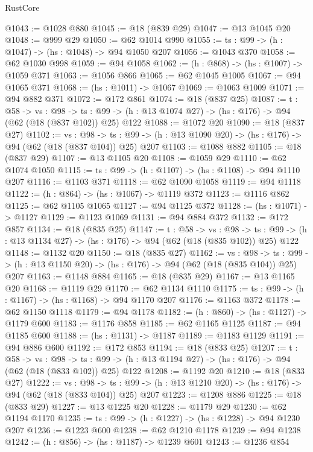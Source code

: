 \begin{lexlean}{RustCore}
\begin{coremodule}
@1043 := @1028 @880
@1045 := @18 (@839 @29)
@1047 := @13 @1045 @20
@1048 := @999 @29
@1050 := @62 @1014 @990
@1055 := {ts : @99} -> (h : @1047) -> (hs : @1048) -> @94 @1050 @207
@1056 := @1043 @370
@1058 := @62 @1030 @998
@1059 := @94 @1058
@1062 := (h : @868) -> (hs : @1007) -> @1059 @371
@1063 := @1056 @866
@1065 := @62 @1045 @1005
@1067 := @94 @1065 @371
@1068 := (hs : @1011) -> @1067
@1069 := @1063 @1009
@1071 := @94 @882 @371
@1072 := @172 @861
@1074 := @18 (@837 @25)
@1087 := {t : @58} ->
  {vs : @98} ->
  {ts : @99} -> (h : @13 @1074 @27) -> (hs : @176) -> @94 (@62 (@18 (@837 @102)) @25) @122
@1088 := @1072 @20
@1090 := @18 (@837 @27)
@1102 := {vs : @98} ->
  {ts : @99} -> (h : @13 @1090 @20) -> (hs : @176) -> @94 (@62 (@18 (@837 @104)) @25) @207
@1103 := @1088 @882
@1105 := @18 (@837 @29)
@1107 := @13 @1105 @20
@1108 := @1059 @29
@1110 := @62 @1074 @1050
@1115 := {ts : @99} -> (h : @1107) -> (hs : @1108) -> @94 @1110 @207
@1116 := @1103 @371
@1118 := @62 @1090 @1058
@1119 := @94 @1118
@1122 := (h : @864) -> (hs : @1067) -> @1119 @372
@1123 := @1116 @862
@1125 := @62 @1105 @1065
@1127 := @94 @1125 @372
@1128 := (hs : @1071) -> @1127
@1129 := @1123 @1069
@1131 := @94 @884 @372
@1132 := @172 @857
@1134 := @18 (@835 @25)
@1147 := {t : @58} ->
  {vs : @98} ->
  {ts : @99} -> (h : @13 @1134 @27) -> (hs : @176) -> @94 (@62 (@18 (@835 @102)) @25) @122
@1148 := @1132 @20
@1150 := @18 (@835 @27)
@1162 := {vs : @98} ->
  {ts : @99} -> (h : @13 @1150 @20) -> (hs : @176) -> @94 (@62 (@18 (@835 @104)) @25) @207
@1163 := @1148 @884
@1165 := @18 (@835 @29)
@1167 := @13 @1165 @20
@1168 := @1119 @29
@1170 := @62 @1134 @1110
@1175 := {ts : @99} -> (h : @1167) -> (hs : @1168) -> @94 @1170 @207
@1176 := @1163 @372
@1178 := @62 @1150 @1118
@1179 := @94 @1178
@1182 := (h : @860) -> (hs : @1127) -> @1179 @600
@1183 := @1176 @858
@1185 := @62 @1165 @1125
@1187 := @94 @1185 @600
@1188 := (hs : @1131) -> @1187
@1189 := @1183 @1129
@1191 := @94 @886 @600
@1192 := @172 @853
@1194 := @18 (@833 @25)
@1207 := {t : @58} ->
  {vs : @98} ->
  {ts : @99} -> (h : @13 @1194 @27) -> (hs : @176) -> @94 (@62 (@18 (@833 @102)) @25) @122
@1208 := @1192 @20
@1210 := @18 (@833 @27)
@1222 := {vs : @98} ->
  {ts : @99} -> (h : @13 @1210 @20) -> (hs : @176) -> @94 (@62 (@18 (@833 @104)) @25) @207
@1223 := @1208 @886
@1225 := @18 (@833 @29)
@1227 := @13 @1225 @20
@1228 := @1179 @29
@1230 := @62 @1194 @1170
@1235 := {ts : @99} -> (h : @1227) -> (hs : @1228) -> @94 @1230 @207
@1236 := @1223 @600
@1238 := @62 @1210 @1178
@1239 := @94 @1238
@1242 := (h : @856) -> (hs : @1187) -> @1239 @601
@1243 := @1236 @854

\end{coremodule}
\end{lexlean}
